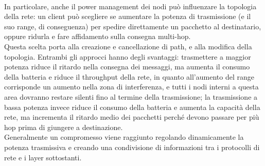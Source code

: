 \\
In particolare, anche il power management dei nodi può influenzare la topologia della rete: un client può scegliere se aumentare la potenza di trasmissione (e il suo range, di conseguenza) per spedire direttamente un pacchetto al destinatario, oppure ridurla e fare affidamento sulla consegna multi-hop.\\
Questa scelta porta alla creazione e cancellazione di path, e alla modifica della topologia. 
Entrambi gli approcci hanno degli svantaggi: trasmettere a maggior potenza riduce il ritardo nella consegna dei messaggi, ma aumenta il consumo della batteria e riduce il throughput della rete, in quanto all'aumento del range corrisponde un aumento nella zona di interferenza, e tutti i nodi interni a questa area dovranno restare silenti fino al termine della trasmissione; la trasmissione a bassa potenza invece riduce il consumo della batteria e aumenta la capacità della rete, ma incrementa il ritardo medio dei pacchetti perché devono passare per più hop prima di giungere a destinazione. \\
Generalmente un compromesso viene raggiunto regolando dinamicamente la potenza trasmissiva e creando una condivisione di informazioni tra i protocolli di rete e i layer sottostanti. \cite{879383}

